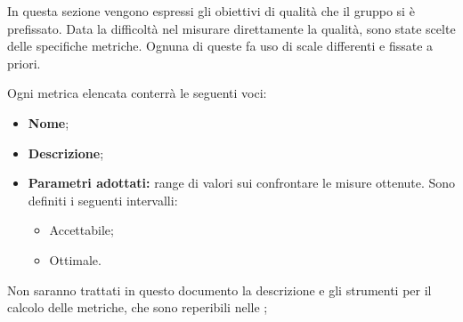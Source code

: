 In questa sezione vengono espressi gli obiettivi di qualità che il gruppo \gruppo \space  si è prefissato. Data la difficoltà nel misurare direttamente la qualità, sono state scelte delle specifiche metriche. Ognuna di queste fa uso di scale differenti e fissate a
priori.

Ogni metrica elencata conterrà le seguenti voci:
\begin{itemize}
	\item \textbf{Nome};
	\item \textbf{Descrizione};
	\item \textbf{Parametri adottati: }range di valori sui confrontare le misure ottenute. Sono definiti i seguenti intervalli:
	\begin{itemize}
		\item Accettabile;
		\item Ottimale.
	\end{itemize}		
	
\end{itemize}

Non saranno trattati in questo documento la descrizione e gli strumenti per il calcolo delle metriche, che sono reperibili nelle \NdP ;
